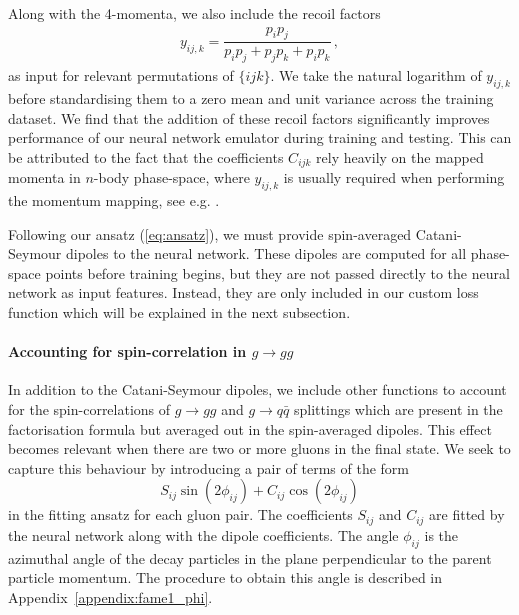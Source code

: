 \documentclass[main.tex]{subfiles}
\begin{document}
Along with the 4-momenta, we also include the recoil factors
\begin{eqnarray}\label{eq:recoil_factor}
    y_{ij,k} = \dfrac{p_{i}p_{j}}{p_{i}p_{j} + p_{j}p_{k} + p_{i}p_{k}} \, ,
\end{eqnarray}
as input for relevant permutations of $\{ijk\}$.
We take the natural logarithm of $y_{ij,k}$ before standardising them to a zero mean and unit variance across the training dataset.
We find that the addition of these recoil factors significantly improves performance of our neural network emulator during training and testing.
This can be attributed to the fact that the coefficients $C_{ijk}$ rely heavily on the mapped momenta in $n$-body phase-space, where $y_{ij,k}$ is usually required when performing the momentum mapping, see e.g. \cite{Catani:1996vz}.

Following our ansatz (\ref{eq:ansatz}), we must provide spin-averaged Catani-Seymour dipoles to the neural network. These dipoles are computed for all phase-space points before training begins, but they are not passed directly to the neural network as input features. Instead, they are only included in our custom loss function which will be explained in the next subsection.

\paragraph*{Accounting for spin-correlation in $g \rightarrow gg$}
In addition to the Catani-Seymour dipoles, we include other functions to account for the spin-correlations of $g \rightarrow gg$ and $g \rightarrow q\bar q$ splittings which are present in the factorisation formula but averaged out in the spin-averaged dipoles.
This effect becomes relevant when there are two or more gluons in the final state.
We seek to capture this behaviour by introducing a pair of terms of the form 
\begin{equation}
S_{ij} \sin\left(2 \phi_{ij}\right) + C_{ij} \cos\left(2\phi_{ij}\right)
\end{equation}
in the fitting ansatz for each gluon pair. The coefficients $S_{ij}$ and $C_{ij}$ are fitted by the neural network along with the dipole coefficients. The angle $\phi_{ij}$ is the azimuthal angle of the decay particles in the plane perpendicular to the parent particle momentum. The procedure to obtain this angle is described in Appendix~\ref{appendix:fame1_phi}.
\end{document}
